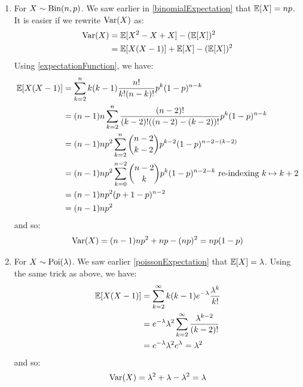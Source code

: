 \documentclass[../main.tex]{subfiles}
\begin{document}
\begin{example}
  \label{varianceExample}
  \begin{enumerate}
    \item For $X \sim \operatorname{Bin}(n, p)$.
      We saw earlier in \cref{binomialExpectation} that $\mathbb{E}[X] = np$.
      It is easier if we rewrite $\operatorname{Var}(X)$ as:
      \begin{align*}
        \operatorname{Var}(X) &= \mathbb{E}[X^2 - X + X] - (\mathbb{E}[X])^2 \\
                &= \mathbb{E}[X(X - 1)] + \mathbb{E}[X] - (\mathbb{E}[X])^2
      \end{align*}
      Using \cref{expectationFunction}, we have:
      \begin{align*}
        \mathbb{E}[X(X-1)] &= \sum_{k = 2}^{n} k(k - 1) \frac{n!}{k!(n - k)!} p^{k}(1 - p)^{n - k} \\
                   &= (n - 1)n\sum_{k = 2}^{n} \frac{(n - 2)!}{(k - 2)!((n - 2) - (k - 2))!} p^{k}(1 - p)^{n - k} \\
                   &= (n - 1)np^2 \sum_{k = 2}^{n} \binom{n - 2}{k - 2}p^{k - 2}(1 - p)^{n - 2 - (k - 2)} \\
                   &= (n - 1)np^2 \sum_{k = 0}^{n - 2} \binom{n - 2}{k}p^{k}(1 - p)^{n - 2 - k} \text{ re-indexing $k \mapsto k + 2$}\\
                   &= (n - 1)np^2 (p + 1 - p)^{n - 2} \\
                   &= (n - 1)np^2
      \end{align*}
      and so:
      \[
        \operatorname{Var}(X) = (n - 1)np^2 + np - (np)^2 = np(1- p)
      \]
    \item For $X \sim \operatorname{Poi}(\lambda)$.
      We saw earlier \cref{poissonExpectation} that $\mathbb{E}[X] = \lambda$.
      Using the same trick as above, we have:
      \begin{align*}
        \mathbb{E}[X(X - 1)] &= \sum_{k = 2}^{\infty} k(k - 1)e^{-\lambda} \frac{\lambda^{k}}{k!} \\
                     &= e^{-\lambda} \lambda^2 \sum_{k = 2}^{\infty} \frac{\lambda^{k - 2}}{(k - 2)!} \\
                     &= e^{-\lambda} \lambda^2 e^{\lambda} = \lambda^2
      \end{align*}
      and so:
      \[
        \operatorname{Var}(X) = \lambda^2 + \lambda - \lambda^2 = \lambda
      \]
  \end{enumerate}
\end{example}
\end{document}
